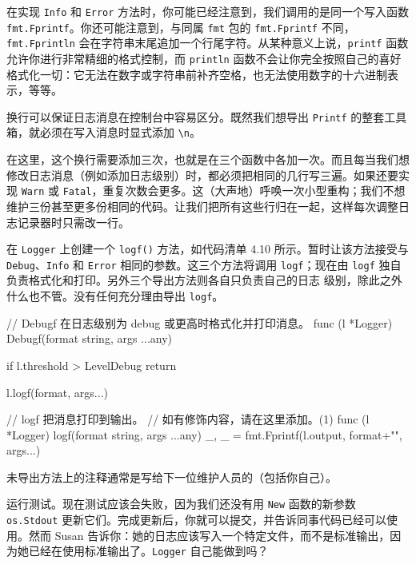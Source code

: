在实现 \texttt{Info} 和 \texttt{Error} 方法时，你可能已经注意到，我们调用的是同一个写入函数 \texttt{fmt.\allowbreak Fprintf}。你还可能注意到，与同属 \texttt{fmt} 包的 \texttt{fmt.Fprintf} 不同，\texttt{fmt.Fprintln} 会在字符串末尾追加一个行尾字符。从某种意义上说，\texttt{printf} 函数允许你进行非常精细的格式控制，而 \texttt{println} 函数不会让你完全按照自己的喜好格式化一切：它无法在数字或字符串前补齐空格，也无法使用数字的十六进制表示，等等。

换行可以保证日志消息在控制台中容易区分。既然我们想导出 \texttt{Printf} 的整套工具箱，就必须在写入消息时显式添加 \texttt{\textbackslash n}。

在这里，这个换行需要添加三次，也就是在三个函数中各加一次。而且每当我们想修改日志消息（例如添加日志级别）时，都必须把相同的几行写三遍。如果还要实现 \texttt{Warn} 或 \texttt{Fatal}，重复次数会更多。这（大声地）呼唤一次小型重构；我们不想维护三份甚至更多份相同的代码。让我们把所有这些行归在一起，这样每次调整日志记录器时只需改一行。

在 \texttt{Logger} 上创建一个 \texttt{logf()} 方法，如代码清单 4.10 所示。暂时让该方法接受与 \texttt{Debug}、\texttt{Info} 和 \texttt{Error} 相同的参数。这三个方法将调用 \texttt{logf}；现在由 \texttt{logf} 独自负责格式化和打印。另外三个导出方法则各自只负责自己的日志
级别，除此之外什么也不管。没有任何充分理由导出 \texttt{logf}。

\begin{gocode}[title={代码清单 4.10 logger.go：重构日志记录方法}]
// Debugf 在日志级别为 debug 或更高时格式化并打印消息。
func (l *Logger) Debugf(format string, args ...any) {
    if l.threshold > LevelDebug {
        return
    }

    l.logf(format, args...)
}

// logf 把消息打印到输出。
// 如有修饰内容，请在这里添加。(1)
func (l *Logger) logf(format string, args ...any) {
    _, _ = fmt.Fprintf(l.output, format+"\n", args...)
}
\end{gocode}

\begin{codeannotations}
  \item 未导出方法上的注释通常是写给下一位维护人员的（包括你自己）。
\end{codeannotations}

运行测试。现在测试应该会失败，因为我们还没有用 \texttt{New} 函数的新参数 \texttt{os.Stdout} 更新它们。完成更新后，你就可以提交，并告诉同事代码已经可以使用。然而 Susan 告诉你：她的日志应该写入一个特定文件，而不是标准输出，因为她已经在使用标准输出了。\texttt{Logger} 自己能做到吗？

